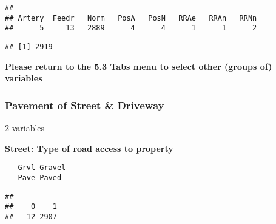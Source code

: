 \documentclass[]{article}
\newenvironment{Shaded}{\begin{snugshade}}{\end{snugshade}}
\newcommand{\KeywordTok}[1]{\textcolor[rgb]{0.13,0.29,0.53}{\textbf{#1}}}
\newcommand{\DecValTok}[1]{\textcolor[rgb]{0.00,0.00,0.81}{#1}}
\newcommand{\StringTok}[1]{\textcolor[rgb]{0.31,0.60,0.02}{#1}}
\newcommand{\CommentTok}[1]{\textcolor[rgb]{0.56,0.35,0.01}{\textit{#1}}}
\newcommand{\OperatorTok}[1]{\textcolor[rgb]{0.81,0.36,0.00}{\textbf{#1}}}
\newcommand{\NormalTok}[1]{#1}
\begin{document}
\begin{verbatim}
## 
## Artery  Feedr   Norm   PosA   PosN   RRAe   RRAn   RRNn 
##      5     13   2889      4      4      1      1      2
\end{verbatim}

\begin{Shaded}
\end{Shaded}

\begin{verbatim}
## [1] 2919
\end{verbatim}

\textbf{Please return to the 5.3 Tabs menu to select other (groups of)
variables}

\subsubsection{Pavement of Street \&
Driveway}\label{pavement-of-street-driveway}

2 variables

\textbf{Street: Type of road access to property}

\begin{verbatim}
   Grvl Gravel  
   Pave Paved
\end{verbatim}

\begin{Shaded}
\end{Shaded}

\begin{verbatim}
## 
##    0    1 
##   12 2907
\end{verbatim}

\begin{Shaded}
\end{Shaded}
\end{document}
